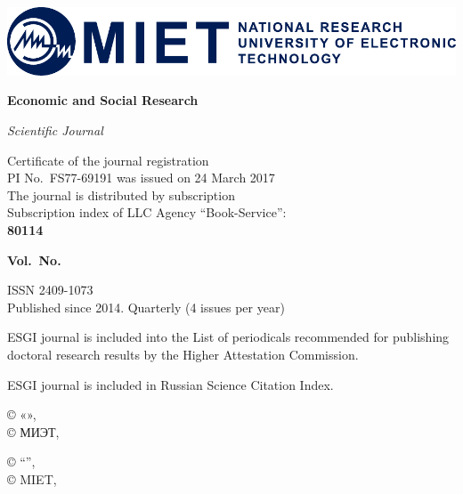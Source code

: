 \vspace{2cm}

\begin{center}
  \includegraphics[width=\textwidth]{logo-en}

  {\fontsize{16pt}{20pt}\selectfont\bfseries Economic and Social Research \par}

  {\itshape Scientific Journal}
\end{center}

\noindent
\begin{minipage}{.5\textwidth}
  \small
  Certificate of the journal registration\\
  PI No. FS77-69191 was issued on 24 March 2017\\
  The journal is distributed by subscription\\
  Subscription index of LLC Agency ``Book-Service'':\\
\textbf{80114}
\end{minipage}%
\begin{minipage}{.5\textwidth}
\begin{flushright}
  {\fontsize{16pt}{20pt}\selectfont\bfseries Vol.\,\esgiVol{} No.\,\esgiNum{}\\
  \esgiYear \par}

  \vspace{5mm}
  \small
  ISSN 2409-1073\\
  Published since 2014. Quarterly (4 issues per year)
\end{flushright}
\end{minipage}

\begin{flushleft}
  \small
  ESGI journal is included into the List of periodicals recommended for publishing doctoral research results by
  the Higher Attestation Commission.

  \vspace{5mm}
  ESGI journal is included in Russian Science Citation Index.
\end{flushleft}

\vfill

\noindent\hrulefill

\noindent
\begin{minipage}{.6\textwidth}
\begin{flushleft}
  \scriptsize
  © «\esgiName{}», \esgiYear\\
  © МИЭТ, \esgiYear
\end{flushleft}
\end{minipage}%
\begin{minipage}{.4\textwidth}
\begin{flushright}
  \scriptsize
  © ``\esgiNameEn{}'', \esgiYear\\
  © MIET, \esgiYear
\end{flushright}
\end{minipage}

\restoregeometry
\clearpage